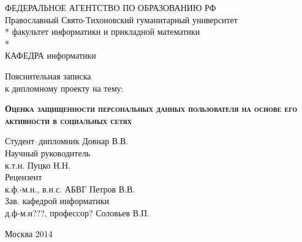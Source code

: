 \begin{titlepage}
\newpage
\begin{center}
ФЕДЕРАЛЬНОЕ АГЕНТСТВО ПО ОБРАЗОВАНИЮ РФ \\
\vspace{1cm}
Православный Свято-Тихоновский гуманитарный университет \\*
факультет информатики и прикладной математики\\*
\hrulefill \\
КАФЕДРА информатики
\end{center}

\vspace{8em}

\begin{center}
\Large Пояснительная записка \\ к дипломному проекту на тему:
\end{center}

\vspace{2.5em}

\begin{center}
\textsc{\textbf{Оценка защищенности персональных данных пользователя на основе его активности в социальных сетях}}
\end{center}

\vspace{6em}

\begin{flushleft}
Студент--дипломник \hrulefill Довнар В.В.\\
\vspace{1.5em}
Научный руководитель \\
к.т.н. \hrulefill Пуцко Н.Н.\\
\vspace{1.5em}
Рецензент \\
к.ф.-м.н., в.н.с. АБВГ \hrulefill Петров В.В.\\
\vspace{1.5em}
Зав. кафедрой информатики\\
д.ф-м.н???, профессор? \hrulefill Соловьев В.П.
\end{flushleft}

\vspace{\fill}

\begin{center}
Москва 2014
\end{center}

\end{titlepage}